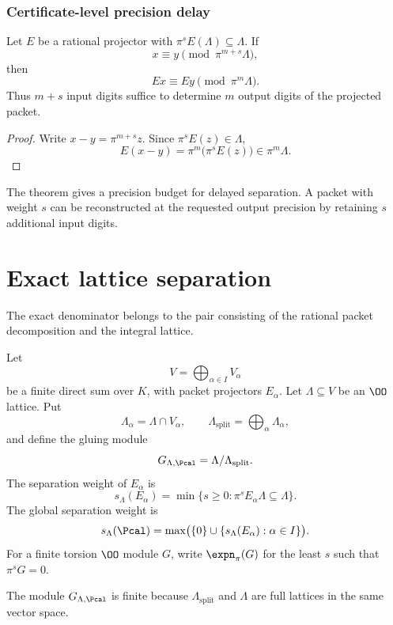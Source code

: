 \subsubsection{Certificate-level precision delay}

\begin{theorem}\label{thm:precision-delay}
Let $E$ be a rational projector with $\pi^sE(\Lambda)\subseteq\Lambda$. If
\[
x\equiv y\pmod{\pi^{m+s}\Lambda},
\]
then
\[
Ex\equiv Ey\pmod{\pi^m\Lambda}.
\]
Thus $m+s$ input digits suffice to determine $m$ output digits of the projected packet.
\end{theorem}

\begin{proof}
Write $x-y=\pi^{m+s}z$. Since $\pi^sE(z)\in\Lambda$,
\[
E(x-y)=\pi^m\bigl(\pi^sE(z)\bigr)\in\pi^m\Lambda.
\]
\end{proof}

The theorem gives a precision budget for delayed separation. A packet with weight $s$ can be reconstructed at the requested output precision by retaining $s$ additional input digits.


\section{Exact lattice separation}\label{sec:lattice}

The exact denominator belongs to the pair consisting of the rational packet decomposition and the integral lattice.

\begin{definition}\label{def:lattice_packet}
Let
\[
V=\bigoplus_{\alpha\in I}V_\alpha
\]
be a finite direct sum over $K$, with packet projectors $E_\alpha$.  Let $\Lambda\subseteq V$ be an $\OO$ lattice.  Put
\[
\Lambda_\alpha=\Lambda\cap V_\alpha,
\qquad
\Lambda_{\mathrm{split}}=\bigoplus_\alpha\Lambda_\alpha,
\]
and define the gluing module
\[
G_{\Lambda,\Pcal}
=
\Lambda/\Lambda_{\mathrm{split}}.
\]
The separation weight of $E_\alpha$ is
\[
s_\Lambda(E_\alpha)
=
\min\{s\geq0:\pi^sE_\alpha\Lambda\subseteq\Lambda\}.
\]
The global separation weight is
\[
s_\Lambda(\Pcal)=\max\bigl(\{0\}\cup\{s_\Lambda(E_\alpha):\alpha\in I\}\bigr).
\]
For a finite torsion $\OO$ module $G$, write $\expn_\pi(G)$ for the least $s$ such that $\pi^sG=0$.
\end{definition}

The module $G_{\Lambda,\Pcal}$ is finite because $\Lambda_{\mathrm{split}}$ and $\Lambda$ are full lattices in the same vector space.

